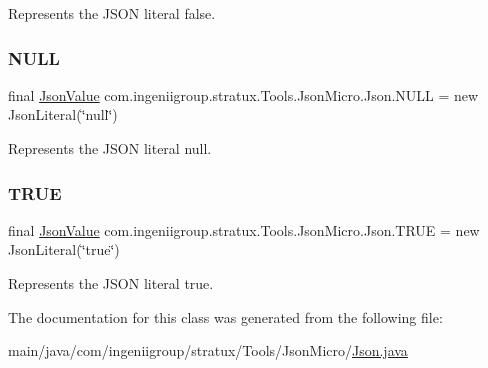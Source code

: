 Represents the J\+S\+ON literal {\ttfamily false}. \mbox{\label{classcom_1_1ingeniigroup_1_1stratux_1_1_tools_1_1_json_micro_1_1_json_a099662304478d72f17898081eead1b67}} 
\subsubsection{\texorpdfstring{N\+U\+LL}{NULL}}
{\footnotesize\ttfamily final \hyperlink{classcom_1_1ingeniigroup_1_1stratux_1_1_tools_1_1_json_micro_1_1_json_value}{Json\+Value} com.\+ingeniigroup.\+stratux.\+Tools.\+Json\+Micro.\+Json.\+N\+U\+LL = new Json\+Literal(\char`\"{}null\char`\"{})\hspace{0.3cm}{\ttfamily [static]}}

Represents the J\+S\+ON literal {\ttfamily null}. \mbox{\label{classcom_1_1ingeniigroup_1_1stratux_1_1_tools_1_1_json_micro_1_1_json_a8123cf7272ded3c560cc7b6af000728e}} 
\subsubsection{\texorpdfstring{T\+R\+UE}{TRUE}}
{\footnotesize\ttfamily final \hyperlink{classcom_1_1ingeniigroup_1_1stratux_1_1_tools_1_1_json_micro_1_1_json_value}{Json\+Value} com.\+ingeniigroup.\+stratux.\+Tools.\+Json\+Micro.\+Json.\+T\+R\+UE = new Json\+Literal(\char`\"{}true\char`\"{})\hspace{0.3cm}{\ttfamily [static]}}

Represents the J\+S\+ON literal {\ttfamily true}. 

The documentation for this class was generated from the following file\+:\begin{DoxyCompactItemize}
\item 
main/java/com/ingeniigroup/stratux/\+Tools/\+Json\+Micro/\hyperlink{_tools_2_json_micro_2_j_s_o_n_8java}{Json.\+java}\end{DoxyCompactItemize}
